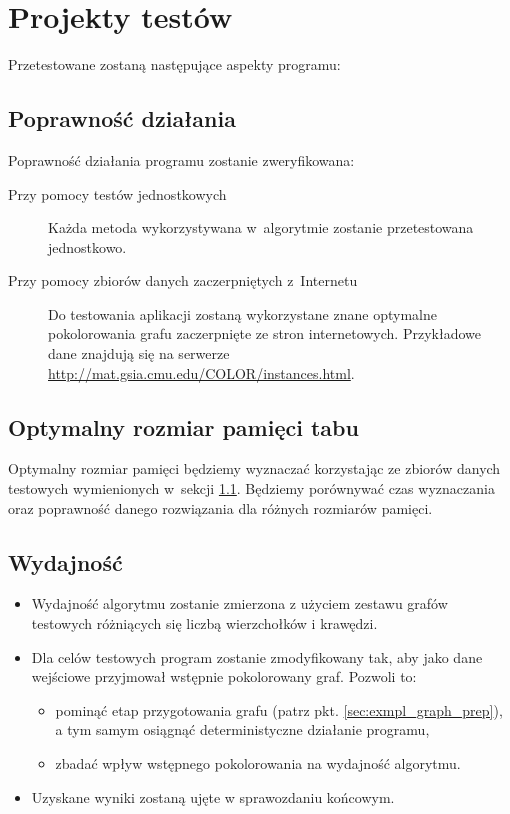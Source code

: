 \section{Projekty testów}
Przetestowane zostaną następujące aspekty programu:

\subsection{Poprawność działania}
\label{sec:algorithm_correctness}
Poprawność działania programu zostanie zweryfikowana:

\begin{description}
 \item [Przy pomocy testów jednostkowych] Każda metoda wykorzystywana w~algorytmie zostanie przetestowana jednostkowo.
 \item [Przy pomocy zbiorów danych zaczerpniętych z~Internetu] Do testowania aplikacji zostaną wykorzystane znane optymalne pokolorowania grafu zaczerpnięte ze stron internetowych. Przykładowe dane znajdują się na serwerze \url{http://mat.gsia.cmu.edu/COLOR/instances.html}.
\end{description}

\subsection{Optymalny rozmiar pamięci tabu}
Optymalny rozmiar pamięci będziemy wyznaczać korzystając ze zbiorów danych testowych wymienionych w~sekcji \ref{sec:algorithm_correctness}. Będziemy porównywać czas wyznaczania oraz poprawność danego rozwiązania dla różnych rozmiarów pamięci. 

\subsection{Wydajność}
\begin{itemize}
 \item Wydajność algorytmu zostanie zmierzona z użyciem zestawu grafów testowych różniących się liczbą wierzchołków i krawędzi.
 \item Dla celów testowych program zostanie zmodyfikowany tak, aby jako dane wejściowe przyjmował wstępnie pokolorowany graf.
  Pozwoli to:
  \begin{itemize}
   \item pominąć etap przygotowania grafu (patrz pkt. \ref{sec:exmpl_graph_prep}), a tym samym osiągnąć deterministyczne działanie programu,
   \item zbadać wpływ wstępnego pokolorowania na wydajność algorytmu.
  \end{itemize}
 \item Uzyskane wyniki zostaną ujęte w sprawozdaniu końcowym.
\end{itemize}
